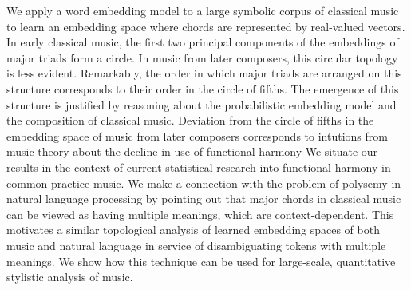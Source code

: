 
We apply a word embedding model to a large symbolic corpus of classical music to learn an embedding space where chords are represented by real-valued vectors.
In early classical music, the first two principal components of the embeddings of major triads form a circle. In music from later composers, this circular topology is less evident.
Remarkably, the order in which major triads are arranged on this structure corresponds to their order in the circle of fifths.
The emergence of this structure is justified by reasoning about the probabilistic embedding model and the composition of classical music.
Deviation from the circle of fifths in the embedding space of music from later composers corresponds to intutions from music theory about the decline in use of functional harmony
We situate our results in the context of current statistical research into functional harmony in common practice music. We make a connection with the problem of polysemy in natural language processing by pointing out that major chords in classical music can be viewed as having multiple meanings, which are context-dependent. This motivates a similar topological analysis of learned embedding spaces of both music and natural language in service of disambiguating tokens with multiple meanings.
We show how this technique can be used for large-scale, quantitative stylistic analysis of music.
